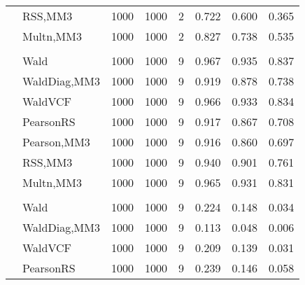 \documentclass[
]{article}
\begin{document}
\begin{table}[H]
{\begin{tabular}[t]{llrrrrrr}
\hspace{1em} & RSS,MM3 & 1000 & 1000 & 2 & 0.722 & 0.600 & 0.365\\

\hspace{1em} & Multn,MM3 & 1000 & 1000 & 2 & 0.827 & 0.738 & 0.535\\
\cmidrule{1-8}
\addlinespace[0.3em]
\multicolumn{8}{l}{\textbf{1F 15V}}\\
\hspace{1em} & Wald & 1000 & 1000 & 9 & 0.967 & 0.935 & 0.837\\

\hspace{1em} & WaldDiag,MM3 & 1000 & 1000 & 9 & 0.919 & 0.878 & 0.738\\

\hspace{1em} & WaldVCF & 1000 & 1000 & 9 & 0.966 & 0.933 & 0.834\\

\hspace{1em} & PearsonRS & 1000 & 1000 & 9 & 0.917 & 0.867 & 0.708\\

\hspace{1em} & Pearson,MM3 & 1000 & 1000 & 9 & 0.916 & 0.860 & 0.697\\

\hspace{1em} & RSS,MM3 & 1000 & 1000 & 9 & 0.940 & 0.901 & 0.761\\

\hspace{1em} & Multn,MM3 & 1000 & 1000 & 9 & 0.965 & 0.931 & 0.831\\
\cmidrule{1-8}
\addlinespace[0.3em]
\multicolumn{8}{l}{\textbf{2F 10V}}\\
\hspace{1em} & Wald & 1000 & 1000 & 9 & 0.224 & 0.148 & 0.034\\

\hspace{1em} & WaldDiag,MM3 & 1000 & 1000 & 9 & 0.113 & 0.048 & 0.006\\

\hspace{1em} & WaldVCF & 1000 & 1000 & 9 & 0.209 & 0.139 & 0.031\\

\hspace{1em} & PearsonRS & 1000 & 1000 & 9 & 0.239 & 0.146 & 0.058\\


\end{tabular}}
\end{table}
\end{document}
